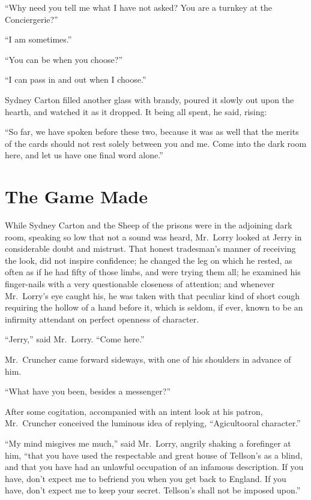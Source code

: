 ``Why need you tell me what I have not asked?  You are a turnkey at the
Conciergerie?''

``I am sometimes.''

``You can be when you choose?''

``I can pass in and out when I choose.''

Sydney Carton filled another glass with brandy, poured it slowly out
upon the hearth, and watched it as it dropped.  It being all spent,
he said, rising:

``So far, we have spoken before these two, because it was as well that
the merits of the cards should not rest solely between you and me.
Come into the dark room here, and let us have one final word alone.''



\chapter{The Game Made}


While Sydney Carton and the Sheep of the prisons were in the
adjoining dark room, speaking so low that not a sound was heard,
Mr.\ Lorry looked at Jerry in considerable doubt and mistrust.  That
honest tradesman's manner of receiving the look, did not inspire
confidence; he changed the leg on which he rested, as often as if he
had fifty of those limbs, and were trying them all; he examined his
finger-nails with a very questionable closeness of attention; and
whenever Mr.\ Lorry's eye caught his, he was taken with that peculiar
kind of short cough requiring the hollow of a hand before it, which
is seldom, if ever, known to be an infirmity attendant on perfect
openness of character.

``Jerry,'' said Mr.\ Lorry.  ``Come here.''

Mr.\ Cruncher came forward sideways, with one of his shoulders in
advance of him.

``What have you been, besides a messenger?''

After some cogitation, accompanied with an intent look at his patron,
Mr.\ Cruncher conceived the luminous idea of replying, ``Agicultooral
character.''

``My mind misgives me much,'' said Mr.\ Lorry, angrily shaking a
forefinger at him, ``that you have used the respectable and great
house of Tellson's as a blind, and that you have had an unlawful
occupation of an infamous description.  If you have, don't expect me
to befriend you when you get back to England.  If you have, don't
expect me to keep your secret.  Tellson's shall not be imposed upon.''

